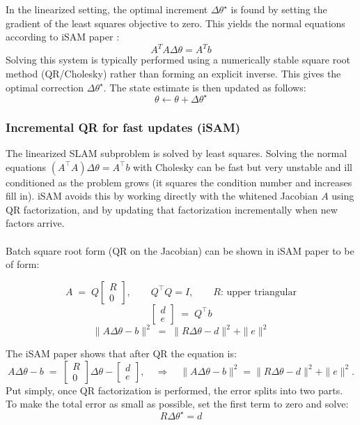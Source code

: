 \\ \\
In the linearized setting, the optimal increment $\Delta\theta^\star$ is found by setting the gradient of the least squares objective to zero. This yields the normal equations according to iSAM paper \cite{iSAM_paper}:
$$
    A^{T}A\Delta\theta = A^{T}b
$$
Solving this system is typically performed using a numerically stable square root method (QR/Cholesky) rather than forming an explicit inverse. This gives the optimal correction $\Delta\theta^\star$. The state estimate is then updated as follows:
$$
    \theta \leftarrow \theta + \Delta\theta^\star
$$



\subsubsection{Incremental QR for fast updates (iSAM)}
The linearized SLAM subproblem is solved by least squares. Solving the normal equations $(A^\top A)\Delta\theta = A^\top b$ with Cholesky can be fast but very unstable and ill conditioned as the problem grows (it squares the condition number and increases fill in). iSAM avoids this by working directly with the whitened Jacobian $A$ using QR factorization, and by updating that factorization incrementally when new factors arrive.
\\ \\
Batch square root form (QR on the Jacobian) can be shown in iSAM paper \cite{iSAM_paper} to be of form:

$$
    A \;=\; Q
    \begin{bmatrix}
    R\\[2pt]
    0
    \end{bmatrix},
    \qquad Q^\top Q = I,
    \qquad R \text{: upper triangular}
$$
$$
    \begin{bmatrix}
    d\\ e
    \end{bmatrix}
    \;=\;
    Q^\top b
$$
$$
    \|A\Delta\theta - b\|^2
    \;=\;
    \|R\Delta\theta - d\|^2 + \|e\|^2
$$

\noindent
The iSAM paper \cite{iSAM_paper} shows that after QR the equation is:
$$
    A\Delta\theta - b \;=\;
    \begin{bmatrix} R \\ 0 \end{bmatrix}\Delta\theta -
    \begin{bmatrix} d \\ e \end{bmatrix},
    \quad\Rightarrow\quad
    \|A\Delta\theta - b\|^2 = \|R\Delta\theta - d\|^2 + \|e\|^2.
$$
\noindent
Put simply, once QR factorization is performed, the error splits into two parts. To make the total error as small as possible, set the first term to zero and solve:
\begin{equation}
    R\Delta\theta^\star = d
    \label{eq:optimizer-iSAM-fast-solution}
\end{equation}

